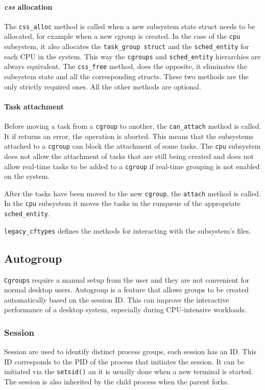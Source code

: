 \paragraph{\textit{css} allocation}
The \verb|css_alloc| method is called when a new subsystem state struct needs to be allocated, for example when a new cgroup is created. In the case of the \verb|cpu| subsystem, it also allocates the \verb|task_group struct| and the \verb|sched_entity| for each CPU in the system. This way the \verb|cgroups| and \verb|sched_entity| hierarchies are always equivalent. The \verb|css_free| method, does the opposite, it eliminates the subsystem state and all the corresponding structs. These two methods are the only strictly required ones. All the other methods are optional.

\paragraph{Task attachment}
Before moving a task from a \verb|cgroup| to another, the \verb|can_attach| method is called. It if returns an error, the operation is aborted. This means that the subsystems attached to a \verb|cgroup| can block the attachment of some tasks. The \verb|cpu| subsystem does not allow the attachment of tasks that are still being created and does not allow real-time tasks to be added to a \verb|cgroup| if real-time grouping is not enabled on the system. 

After the tasks have been moved to the new \verb|cgroup|, the \verb|attach| method is called. In the \verb|cpu| subsystem it moves the tasks in the runqueue of the appropriate \verb|sched_entity|.

\verb|legacy_cftypes| defines the methods for interacting with the subsystem's files.

\subsection{Autogroup}%

\verb|Cgroups| require a manual setup from the user and they are not convenient for normal desktop users. Autogroup is a feature that allows groups to be created automatically based on the session ID. This can improve the interactive performance of a desktop system, especially during CPU-intensive workloads.

\subsubsection{Session}
Session are used to identify distinct process groups, each session has an ID. This ID corresponds to the PID of the process that initiates the session. It can be initiated via the \verb|setsid()| an it is usually done when a new terminal is started. The session is also inherited by the child process when the parent forks.

